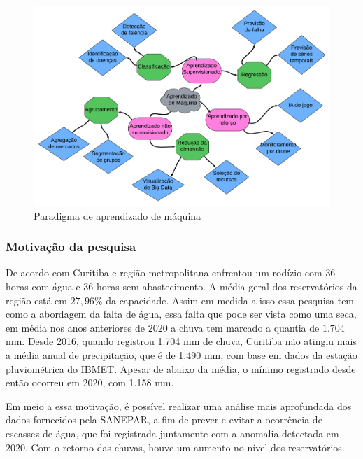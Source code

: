 \begin{figure}[htpb!]
	\centering
	\caption{Paradigma de aprendizado de máquina}
	\includegraphics[width=1\linewidth]{Introducao/Figuras/paradigma-ml}
	
	\label{fig:paradigma-ml}
\end{figure}
  
      
\subsubsection{Motiva\c c\~ao da pesquisa} \label{subsubsec:motivacao}
 
    
    De acordo com \cite{vasconcelos_2020} Curitiba e região metropolitana enfrentou um rodízio com $36$ horas com água e $36$ horas sem abastecimento. A média geral dos reservatórios da região está em $27,96\%$ da capacidade. Assim em medida a isso essa pesquisa tem como a abordagem da falta de água, essa falta que pode ser vista como uma seca, em média nos anos anteriores de 2020 a chuva tem marcado a quantia de $1.704$ mm. \cite{vasconcelos_2020} Desde 2016, quando registrou 1.704 mm de chuva, Curitiba não atingiu mais a média anual de precipitação, que é de 1.490 mm, com base em dados da estação pluviométrica do IBMET.  Apesar de abaixo da média, o mínimo registrado desde então ocorreu em 2020, com 1.158 mm.
    
   Em meio a essa motivação, é possível realizar uma análise mais aprofundada dos dados fornecidos pela SANEPAR, a fim de prever e evitar a ocorrência de escassez de água, que foi registrada juntamente com a anomalia detectada em 2020. Com o retorno das chuvas, houve um aumento no nível dos reservatórios.
    
    